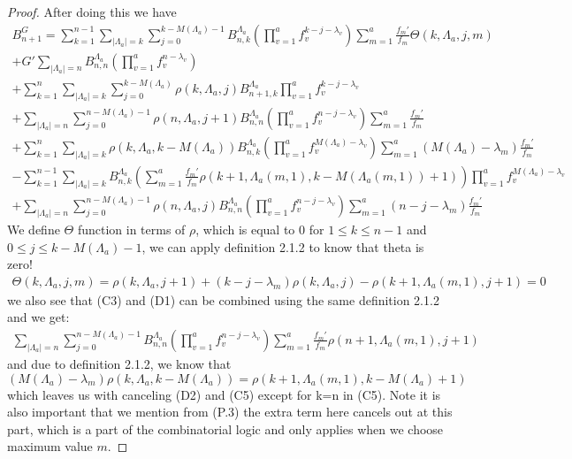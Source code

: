 \documentclass[11pt]{article}
\theoremstyle{plain}
\theoremstyle{definition}
\begin{document}
\begin{proof}
After doing this we have
\begin{align*}
    B_{n+1}^G = \sum_{k=1}^{n-1} \sum_{|\Lambda_a|=k} \sum_{j=0}^{k-M(\Lambda_a)-1}  B_{n,k}^{\Lambda_a}\left(\prod_{v=1}^af_v^{k-j-\lambda_v}\right) \sum_{m=1}^a \frac{f_m'}{f_m}\Theta(k,\Lambda_a,j,m) \tag{C1+C4-C7}\\
    +G' \sum_{|\Lambda_a|=n}B_{n,n}^{\Lambda_a} \left(\prod_{v=1}^af_v^{n-\lambda_v}\right) \tag{C2-C8}\\
    +\sum_{k=1}^n \sum_{|\Lambda_a|=k} \sum_{j=0}^{k-M(\Lambda_a)}\rho(k,\Lambda_a,j)B_{n+1,k}^{\Lambda_a} \prod_{v=1}^a f_v^{k-j-\lambda_v} \tag{C6}\\
    +\sum_{|\Lambda_a|=n} \sum_{j=0}^{n-M(\Lambda_a)-1}\rho(n,\Lambda_a,j+1)B_{n,n}^{\Lambda_a} \left(\prod_{v=1}^af_v^{n-j-\lambda_v}\right)\sum_{m=1}^a \frac{f_m'}{f_m} \tag{C3}\\
  + \sum_{k=1}^n \sum_{|\Lambda_a|=k} \rho(k,\Lambda_a,k-M(\Lambda_a))B_{n,k}^{\Lambda_a}\left(\prod_{v=1}^a f_v^{M(\Lambda_a)-\lambda_v}\right) \sum_{m=1}^a (M(\Lambda_a)-\lambda_m)\frac{f_m'}{f_m}\tag{C5}\\
    - \sum_{k=1}^{n-1} \sum_{|\Lambda_a|=k} B_{n,k}^{\Lambda_a}\left(\sum_{m=1}^a\frac{f_m'}{f_m}\rho(k+1,\Lambda_a(m,1),k-M(\Lambda_a(m,1))+1)\right) \prod_{v=1}^a f_v^{M(\Lambda_a)-\lambda_v} \tag{D2}\\
    +\sum_{|\Lambda_a|=n}\sum_{j=0}^{n-M(\Lambda_a)-1} \rho(n,\Lambda_a,j)B_{n,n}^{\Lambda_a}\left(\prod_{v=1}^a f_v^{n-j-\lambda_v}\right) \sum_{m=1}^a (n-j-\lambda_m)\frac{f_m'}{f_m} \tag{D1}
\end{align*}
We define $\Theta$ function in terms of $\rho$, which is equal to $0$ for $1\le k\le n-1$ and $0\le j\le k-M(\Lambda_a)-1$, we can apply definition 2.1.2 to know that theta is zero!
\begin{align*}
    \Theta(k,\Lambda_a,j,m) = \rho(k,\Lambda_a,j+1) + (k-j-\lambda_m)\rho(k,\Lambda_a,j) - \rho(k+1,\Lambda_a(m,1),j+1) = 0
\end{align*}
we also see that (C3) and (D1) can be combined using the same definition 2.1.2 and we get:
\begin{align*}
    \sum_{|\Lambda_a|=n} \sum_{j=0}^{n-M(\Lambda_a)-1} B_{n,n}^{\Lambda_a}\left(\prod_{v=1}^a f_v^{n-j-\lambda_v}\right) \sum_{m=1}^a \frac{f_m'}{f_m} \rho(n+1,\Lambda_a(m,1),j+1)
\end{align*}
and due to definition 2.1.2, we know that $(M(\Lambda_a)-\lambda_m)\rho(k,\Lambda_a,k-M(\Lambda_a))=\rho(k+1,\Lambda_a(m,1),k-M(\Lambda_a)+1)$ which leaves us with canceling (D2) and (C5) except for k=n in (C5). Note it is also important that we mention from (P.3) the extra term here cancels out at this part, which is a part of the combinatorial logic and only applies when we choose maximum value $m$.


\end{proof}
\end{document}
